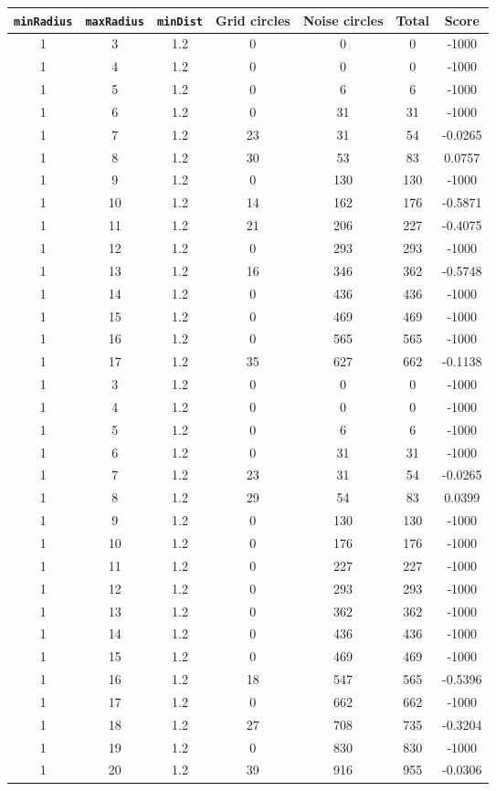 \documentclass[letterpaper, 12pt]{article}
\begin{document}
\begin{longtable}{|c|c|c|c|c|c|c|}
\hline
\textbf{\texttt{minRadius}} & \textbf{\texttt{maxRadius}} & \textbf{\texttt{minDist}} & \textbf{Grid circles} & \textbf{Noise circles} & \textbf{Total} & \textbf{Score} \\
\hline
1 & 3 & 1.2 & 0 & 0 & 0 & -1000 \\
\hline
1 & 4 & 1.2 & 0 & 0 & 0 & -1000 \\
\hline
1 & 5 & 1.2 & 0 & 6 & 6 & -1000 \\
\hline
1 & 6 & 1.2 & 0 & 31 & 31 & -1000 \\
\hline
1 & 7 & 1.2 & 23 & 31 & 54 & -0.0265 \\
\hline
1 & 8 & 1.2 & 30 & 53 & 83 & 0.0757 \\
\hline
1 & 9 & 1.2 & 0 & 130 & 130 & -1000 \\
\hline
1 & 10 & 1.2 & 14 & 162 & 176 & -0.5871 \\
\hline
1 & 11 & 1.2 & 21 & 206 & 227 & -0.4075 \\
\hline
1 & 12 & 1.2 & 0 & 293 & 293 & -1000 \\
\hline
1 & 13 & 1.2 & 16 & 346 & 362 & -0.5748 \\
\hline
1 & 14 & 1.2 & 0 & 436 & 436 & -1000 \\
\hline
1 & 15 & 1.2 & 0 & 469 & 469 & -1000 \\
\hline
1 & 16 & 1.2 & 0 & 565 & 565 & -1000 \\
\hline
1 & 17 & 1.2 & 35 & 627 & 662 & -0.1138 \\
\hline
1 & 3 & 1.2 & 0 & 0 & 0 & -1000 \\
\hline
1 & 4 & 1.2 & 0 & 0 & 0 & -1000 \\
\hline
1 & 5 & 1.2 & 0 & 6 & 6 & -1000 \\
\hline
1 & 6 & 1.2 & 0 & 31 & 31 & -1000 \\
\hline
1 & 7 & 1.2 & 23 & 31 & 54 & -0.0265 \\
\hline
1 & 8 & 1.2 & 29 & 54 & 83 & 0.0399 \\
\hline
1 & 9 & 1.2 & 0 & 130 & 130 & -1000 \\
\hline
1 & 10 & 1.2 & 0 & 176 & 176 & -1000 \\
\hline
1 & 11 & 1.2 & 0 & 227 & 227 & -1000 \\
\hline
1 & 12 & 1.2 & 0 & 293 & 293 & -1000 \\
\hline
1 & 13 & 1.2 & 0 & 362 & 362 & -1000 \\
\hline
1 & 14 & 1.2 & 0 & 436 & 436 & -1000 \\
\hline
1 & 15 & 1.2 & 0 & 469 & 469 & -1000 \\
\hline
1 & 16 & 1.2 & 18 & 547 & 565 & -0.5396 \\
\hline
1 & 17 & 1.2 & 0 & 662 & 662 & -1000 \\
\hline
1 & 18 & 1.2 & 27 & 708 & 735 & -0.3204 \\
\hline
1 & 19 & 1.2 & 0 & 830 & 830 & -1000 \\
\hline
1 & 20 & 1.2 & 39 & 916 & 955 & -0.0306 \\
\hline
\end{longtable}
\end{document}
